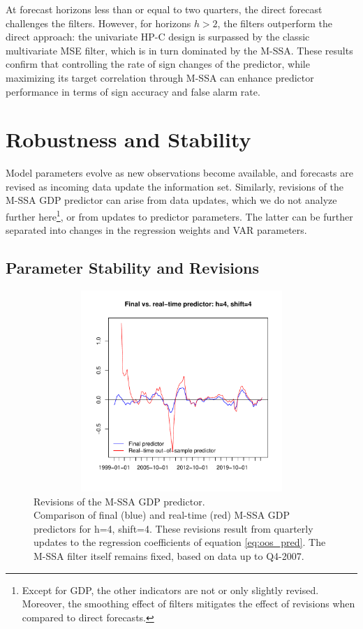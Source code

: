 \documentclass[11pt,a4paper]{article}
\begin{document}
At forecast horizons less than or equal to two quarters, the direct forecast challenges the filters. However, for horizons $h>2$, the filters outperform the direct approach: the univariate HP-C design is surpassed by the classic multivariate MSE filter, which is in turn dominated by the M-SSA. These results confirm that controlling the rate of sign changes of the predictor, while maximizing its target correlation through M-SSA can enhance predictor performance in terms of sign accuracy and false alarm rate.



\section{Robustness and Stability}\label{sec:revisions}
Model parameters evolve as new observations become available, and forecasts are revised as incoming data update the information set. Similarly, revisions of the M-SSA GDP predictor can arise from data updates, which we do not analyze further here\footnote{Except for GDP, the other indicators are not or only slightly revised. Moreover, the smoothing effect of filters mitigates the effect of revisions when compared to direct forecasts.}, or from updates to predictor parameters. The latter can be further separated into changes in the regression weights and VAR parameters. 

\subsection{Parameter Stability and Revisions}

\begin{figure}[htpb]
    \begin{center}
        \includegraphics[height=3in, width=4.5in]{./Figures/revisions1.pdf}
        \caption{Revisions of the M-SSA GDP predictor.\\
        Comparison of final (blue) and real-time (red) M-SSA GDP  predictors for h=4, shift=4. These revisions result from quarterly updates to the regression coefficients of equation \eqref{eq:oos_pred}. The M-SSA filter    itself remains fixed, based on data up to Q4-2007.
        \label{fig:revisions1}}
    \end{center}
    \end{figure}
\end{document}
